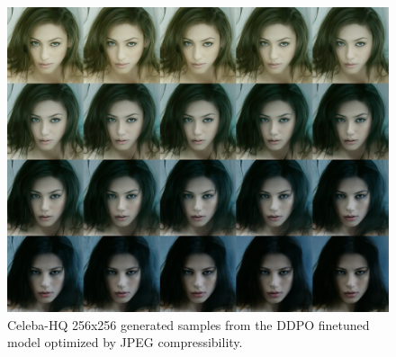 \begin{appendixs}
        \begin{figure}
            \centering
            \includegraphics[scale=1.40]{img/results/compressibility_40.png}
            \vspace{-0pt}  %
            \captionsetup{width=\textwidth} %
            \caption{Celeba-HQ 256x256 generated samples from the DDPO finetuned model optimized by JPEG compressibility.}
            \label{fig:ddpm-to-ddpo-compressibility-extra1}
        \end{figure}


\end{appendixs}
